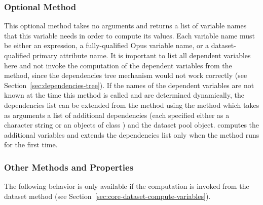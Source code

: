 \subsubsection{Optional Method }
 
\label{sec:dependencies}
%
This optional method takes no arguments and returns a list of variable names
that this variable needs in order to compute its values. Each variable name
must be either an expression, a fully-qualified Opus variable name, or a dataset-qualified 
primary attribute name. It is important to list all dependent variables
here and not invoke the computation of the dependent variables from the
 method, since the dependencies tree mechanism would not
work correctly (see Section~\ref{sec:dependencies-tree}). If the names of the
dependent variables are not known at the time this method is called and are determined dynamically, the
dependencies list can be extended from the  method using the
 method  which takes as arguments
a list of additional dependencies (each specified either as a character string or an objects of class ) 
and the dataset pool object.  computes 
the additional variables and extends the
dependencies list only when the  method runs for the first
time.

\subsubsection{Other Methods and Properties}
%
The following behavior is only available if the computation is invoked from the dataset method  
 (see Section~\ref{sec:core-dataset-compute-variables}).

